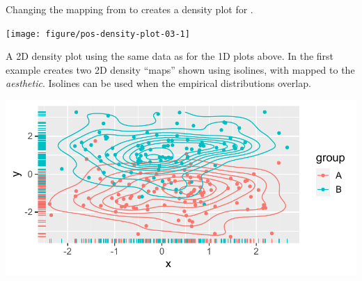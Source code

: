\documentclass[krantz2]{krantz}\usepackage{knitr}
\begin{document}
Changing the mapping from  to  creates a density plot for .

\begin{knitrout}\footnotesize
{}\color{fgcolor}\begin{kframe}
\begin{alltt}
 \hlkwb{<-}
  \hlstd{(} 
        \hlstd{=} \hlstd{(}      \hlopt{+}
  \hlstd{(} \hlstd{=} \hlstd{)}
\end{alltt}
\end{kframe}
\end{knitrout}

\begin{knitrout}\footnotesize
{}\color{fgcolor}\begin{kframe}
\begin{alltt}
 \hlopt{+} 
\end{alltt}
\end{kframe}

{\centering \texttt{[image: figure/pos-density-plot-03-1]} 

}


\end{knitrout}


A 2D density plot using the same data as for the 1D plots above. In the first example  creates two 2D density ``maps'' shown using isolines, with  mapped to the  \emph{aesthetic}. Isolines can be used when the empirical distributions overlap.



\begin{knitrout}\footnotesize
{}\color{fgcolor}\begin{kframe}
\begin{alltt}
\hlstd{(} 
        \hlstd{=} \hlstd{(}      \hlopt{+}
  \hlstd{()}
\end{alltt}
\end{kframe}

{\centering \includegraphics[width=.46\textwidth]{figure/pos-density-plot-10-1} 

}


\end{knitrout}
\end{document}
